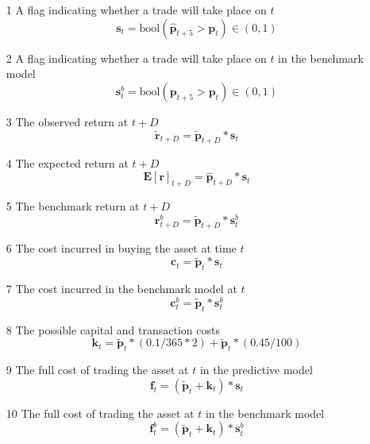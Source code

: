 \documentclass[a4paper,11pt,oneside]{article}
\theoremstyle{plain}
\theoremstyle{definition}
\begin{document}
\begin{itemize}
	\item [1] A flag indicating whether a trade will take place on $t$
				\begin{equation}
				\mathbf{s}_t = \mathrm{bool}(\mathbf{\hat{p}}_{t+5} > \mathbf{p}_t) \in (0, 1)
				\end{equation}
	\item [2] A flag indicating whether a trade will take place on $t$ in the benchmark model
				\begin{equation}
				\mathbf{s}^b_{t} = \mathrm{bool}({\mathbf{p}}_{t+5} > \mathbf{p}_t) \in (0, 1)
				\end{equation}
	\item [3] The observed return at $t+D$
				\begin{equation}
				\mathbf{\tilde{r}}_{t + D} = \mathbf{\tilde{p}}_{t+D} * \mathbf{s}_t
				\end{equation}	
	\item [4] The expected return at $t+D$
				\begin{equation}
				\mathbf{E[r]}_{t + D} = \mathbf{\hat{p}}_{t+D} * \mathbf{s}_t
				\end{equation}
	\item [5] The benchmark return at $t+D$
				\begin{equation}
				\mathbf{r}^b_{t + D} = \mathbf{\tilde{p}}_{t+D} * \mathbf{s}^b_{t}
				\end{equation}
				
				
				
	\item [6] The cost incurred in buying the asset at time $t$
				\begin{equation}
				\mathbf{c}_t = \mathbf{\tilde{p}}_t * \mathbf{s}_t
				\end{equation}
	\item [7] The cost incurred in the benchmark model at $t$
				\begin{equation}
				\mathbf{c}^b_{t} = \mathbf{\tilde{p}}_t * \mathbf{s}^b_{t}
				\end{equation}
	\item [8] The possible capital and transaction costs
				\begin{equation}
				\mathbf{k}_t= \mathbf{\tilde{p}}_t * (0.1 / 365 * 2) + \mathbf{\tilde{p}}_t * (0.45 / 100)
				\end{equation}
	\item [9] The full cost of trading the asset at $t$ in the predictive model
				\begin{equation}
				\mathbf{f}_t = (\mathbf{\tilde{p}}_t + \mathbf{k}_t) * \mathbf{s}_t
				\end{equation}	
	\item [10] The full cost of trading the asset at $t$ in the benchmark model
				\begin{equation}
				\mathbf{f}^b_{t} = (\mathbf{\tilde{p}}_t + \mathbf{k}_t) * \mathbf{s}^b_{t}
				\end{equation}
\end{itemize}
\end{document}
